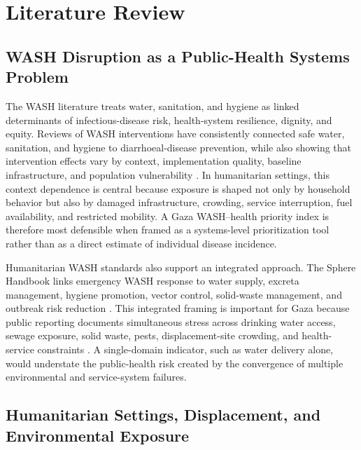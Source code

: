 \section{Literature Review}

\subsection{WASH Disruption as a Public-Health Systems Problem}

The WASH literature treats water, sanitation, and hygiene as linked determinants of infectious-disease risk, health-system resilience, dignity, and equity. Reviews of WASH interventions have consistently connected safe water, sanitation, and hygiene to diarrhoeal-disease prevention, while also showing that intervention effects vary by context, implementation quality, baseline infrastructure, and population vulnerability \citep{fewtrell_2005,cairncross_2010,taylor_2015}. In humanitarian settings, this context dependence is central because exposure is shaped not only by household behavior but also by damaged infrastructure, crowding, service interruption, fuel availability, and restricted mobility. A Gaza WASH--health priority index is therefore most defensible when framed as a systems-level prioritization tool rather than as a direct estimate of individual disease incidence.

Humanitarian WASH standards also support an integrated approach. The Sphere Handbook links emergency WASH response to water supply, excreta management, hygiene promotion, vector control, solid-waste management, and outbreak risk reduction \citep{sphere_2018}. This integrated framing is important for Gaza because public reporting documents simultaneous stress across drinking water access, sewage exposure, solid waste, pests, displacement-site crowding, and health-service constraints \citep{ocha_2026_apr17,ocha_2026_may15}. A single-domain indicator, such as water delivery alone, would understate the public-health risk created by the convergence of multiple environmental and service-system failures.

\subsection{Humanitarian Settings, Displacement, and Environmental Exposure}

